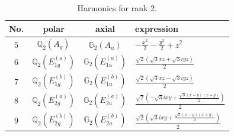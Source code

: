 \documentclass[fleqn,8pt,landscape]{jsarticle}
\begin{document}
\begin{table}[ht!]
\begin{center}
\caption{Harmonics for rank 2.}
\renewcommand{\arraystretch}{1.3}
\begin{tabular}{cccl} \hline \hline
No. & polar & axial & expression \\ \hline
$ 5 $ & $ \mathbb{Q}_{2}(A_{g}) $ & $ \mathbb{G}_{2}(A_{u}) $ & $ - \frac{x^{2}}{2} - \frac{y^{2}}{2} + z^{2} $ \\
$ 6 $ & $ \mathbb{Q}_{2}(E_{1g}^{(a)}) $ & $ \mathbb{G}_{2}(E_{1u}^{(a)}) $ & $ \frac{\sqrt{2} \left(\sqrt{3} x z + \sqrt{3} i y z\right)}{2} $ \\
$ 7 $ & $ \mathbb{Q}_{2}(E_{1g}^{(b)}) $ & $ \mathbb{G}_{2}(E_{1u}^{(b)}) $ & $ \frac{\sqrt{2} \left(\sqrt{3} x z - \sqrt{3} i y z\right)}{2} $ \\
$ 8 $ & $ \mathbb{Q}_{2}(E_{2g}^{(a)}) $ & $ \mathbb{G}_{2}(E_{2u}^{(a)}) $ & $ \frac{\sqrt{2} \left(- \sqrt{3} i x y + \frac{\sqrt{3} \left(x - y\right) \left(x + y\right)}{2}\right)}{2} $ \\
$ 9 $ & $ \mathbb{Q}_{2}(E_{2g}^{(b)}) $ & $ \mathbb{G}_{2}(E_{2u}^{(b)}) $ & $ \frac{\sqrt{2} \left(\sqrt{3} i x y + \frac{\sqrt{3} \left(x - y\right) \left(x + y\right)}{2}\right)}{2} $ \\
 \hline \hline
\end{tabular}
\end{center}
\end{table}
\end{document}
